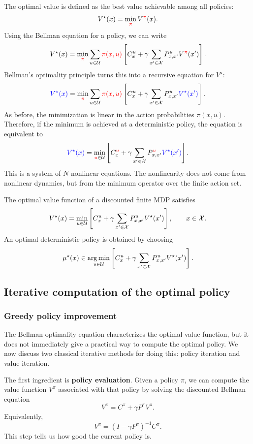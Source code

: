 The optimal value is defined as the best value achievable among all policies:
\[
V^\star(x)
=
\min_{\textcolor{red}{\pi}} V^{\textcolor{red}{\pi}} (x).
\]
Using the Bellman equation for a policy, we can write
\[
V^\star(x)
=
\min_{\textcolor{red}{\pi}}
\sum_{u\in\mathcal{U}}\textcolor{red}{\pi(x,u)}
\left[
C_x^u
+
\gamma\sum_{x'\in\mathcal{X}}P^u_{x,x'}V^{\textcolor{red}{\pi}}(x')
\right].
\]
Bellman's optimality principle turns this into a recursive equation for \(V^\star\):
\[
\textcolor{blue}{V^\star(x)}
=
\min_{\textcolor{red}{\pi}}
\sum_{u\in\mathcal{U}}\textcolor{red}{\pi(x,u)}
\left[
C_x^u
+
\gamma\sum_{x'\in\mathcal{X}}P^u_{x,x'}\textcolor{blue}{V^\star(x')}
\right].
\]
As before, the minimization is linear in the action probabilities \(\pi(x,u)\). Therefore, if the
minimum is achieved at a deterministic policy, the equation is equivalent to
\[
\textcolor{blue}{V^\star(x)}
=
\min_{\textcolor{red}{u}\in\mathcal{U}}
\left[
C_x^{\textcolor{red}{u}}
+
\gamma\sum_{x'\in\mathcal{X}}P^{\textcolor{red}{u}}_{x,x'}\textcolor{blue}{V^\star(x')}
\right].
\]
This is a system of \(N\) nonlinear equations. The nonlinearity does not come from nonlinear
dynamics, but from the minimum operator over the finite action set.

\begin{theorembox}
The optimal value function of a discounted finite MDP satisfies
\[
V^\star(x)
=
\min_{u\in\mathcal{U}}
\left[
C_x^u
+
\gamma\sum_{x'\in\mathcal{X}}P^u_{x,x'}V^\star(x')
\right],
\qquad x\in\mathcal{X}.
\]
An optimal deterministic policy is obtained by choosing
\[
\mu^\star(x)
\in
\operatorname*{arg\,min}_{u\in\mathcal{U}}
\left[
C_x^u
+
\gamma\sum_{x'\in\mathcal{X}}P^u_{x,x'}V^\star(x')
\right].
\]
\end{theorembox}

\subsection{Iterative computation of the optimal policy}
\subsubsection{Greedy policy improvement}
The Bellman optimality equation characterizes the optimal value function, but it does not
immediately give a practical way to compute the optimal policy. We now discuss two classical
iterative methods for doing this: policy iteration and value iteration.

The first ingredient is \textbf{policy evaluation}. Given a policy \(\pi\), we can compute the value
function \(V^\pi\) associated with that policy by solving the discounted Bellman equation
\[
V^\pi
=
C^\pi+\gamma P^\pi V^\pi.
\]
Equivalently,
\[
V^\pi
=
(I-\gamma P^\pi)^{-1}C^\pi.
\]
This step tells us how good the current policy is.

